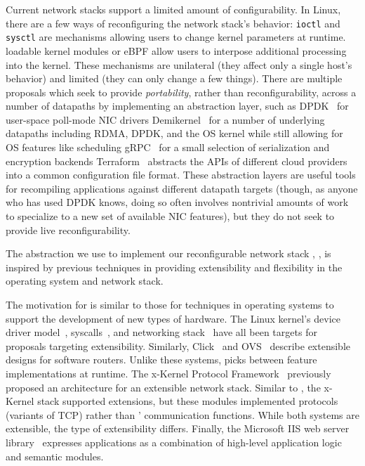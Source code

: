 \begin{outline}
\1 Current network stacks support a limited amount of configurability.
  \2 In Linux, there are a few ways of reconfiguring the network stack's behavior:
    \3 \texttt{ioctl} and \texttt{sysctl} are mechanisms allowing users to change kernel parameters at runtime.
    \3 loadable kernel modules or eBPF allow users to interpose additional processing into the kernel.
    \3 These mechanisms are unilateral (they affect only a single host's behavior) and limited (they can only change a few things).
  \2 There are multiple proposals which seek to provide \emph{portability}, rather than reconfigurability, across a number of datapaths by implementing an abstraction layer, such as 
    \3 DPDK~\cite{dpdk} for user-space poll-mode NIC drivers
    \3 Demikernel~\cite{demikernel} for a number of underlying datapaths including RDMA, DPDK, and the OS kernel while still allowing for OS features like scheduling
    \3 gRPC~\cite{grpc} for a small selection of serialization and encryption backends
    \3 Terraform~\cite{terraform} abstracts the APIs of different cloud providers into a common configuration file format.
    \2 These abstraction layers are useful tools for recompiling applications against different datapath targets (though, as anyone who has used DPDK knows, doing so often involves nontrivial amounts of work to specialize to a new set of available NIC features), but they do not seek to provide live reconfigurability.
\end{outline}

The abstraction we use to implement our reconfigurable network stack \name, \tunnels, is inspired by previous techniques in providing extensibility and flexibility in the operating system and network stack.

 The motivation for \tunnels is similar to those for techniques in operating systems to support the development of new types of hardware. The Linux kernel's device driver model~\cite{linux-device}, syscalls~\cite{slic}, and networking stack~\cite{tcp-ebpf, tcp-ebpf2} have all been targets for proposals targeting extensibility. Similarly, Click~\cite{click} and OVS~\cite{ovs-extend} describe extensible designs for software routers. Unlike these systems, \name picks between feature implementations at runtime. The x-Kernel Protocol Framework~\cite{xkernel} previously proposed an architecture for an extensible network stack. Similar to \name, the x-Kernel stack supported extensions, but these modules implemented protocols (\eg variants of TCP) rather than \tunnels' communication functions. While both systems are extensible, the type of extensibility differs. Finally, the Microsoft IIS web server library~\cite{msft-iis} expresses applications as a combination of high-level application logic and semantic modules. 

